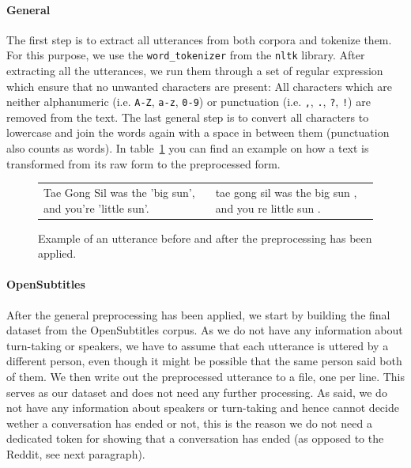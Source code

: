 \paragraph{General} The first step is to extract all utterances from both corpora and tokenize them. For this purpose, we use the \texttt{word\_tokenizer} from the \texttt{nltk} library. After extracting all the utterances, we run them through a set of regular expression which ensure that no unwanted characters are present: All characters which are neither alphanumeric (i.e. \texttt{A-Z}, \texttt{a-z}, \texttt{0-9}) or punctuation (i.e. \texttt{,}, \texttt{.}, \texttt{?}, \texttt{!}) are removed from the text. The last general step is to convert all characters to lowercase and join the words again with a space in between them (punctuation also counts as words). In table~\ref{data:preprocessing:table_after_preprocessing} you can find an example on how a text is transformed from its raw form to the preprocessed form.
\\
\begin{figure}[h]
	\centering
	\begin{adjustbox}{max width=\textwidth}
		\begin{tabular}{ll}
			\toprule
			\specialcell{Raw Utterance} & \specialcell{Preprocessed Utterance}\\
			\midrule
			Tae Gong Sil was the 'big sun', and you're 'little sun'. & tae gong sil was the big sun , and you re little sun . \\
			\bottomrule
		\end{tabular}
	\end{adjustbox}
	\caption{Example of an utterance before and after the preprocessing has been applied.}
	\label{data:preprocessing:table_after_preprocessing}
\end{figure}

\paragraph{OpenSubtitles} After the general preprocessing has been applied, we start by building the final dataset from the OpenSubtitles corpus. As we do not have any information about turn-taking or speakers, we have to assume that each utterance is uttered by a different person, even though it might be possible that the same person said both of them. We then write out the preprocessed utterance to a file, one per line. This serves as our dataset and does not need any further processing. As said, we do not have any information about speakers or turn-taking and hence cannot decide wether a conversation has ended or not, this is the reason we do not need a dedicated token for showing that a conversation has ended (as opposed to the Reddit, see next paragraph).

